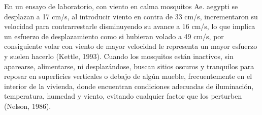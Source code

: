 En un ensayo de laboratorio, con viento en calma mosquitos
Ae. aegypti se desplazan a 17 cm/s, al introducir viento en contra
de 33 cm/s, incrementaron su velocidad para contrarrestarle disminuyendo
su avance a 16 cm/s, lo que implica un esfuerzo de desplazamiento
como si hubieran volado a 49 cm/s, por consiguiente volar con
viento de mayor velocidad le representa un mayor esfuerzo y suelen
hacerlo (Kettle, 1993). Cuando los mosquitos están inactivos, sin
aparearse, alimentarse, ni desplazándose, buscan sitios oscuros y
tranquilos para reposar en superficies verticales o debajo de algún
mueble, frecuentemente en el interior de la vivienda, donde encuentran
condiciones adecuadas de iluminación, temperatura, humedad y viento,
evitando cualquier factor que los perturben (Nelson, 1986).
